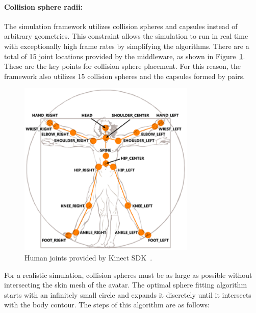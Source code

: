 \documentclass[number,preprint,review,12pt]{elsarticle}
\begin{document}
\paragraph{Collision sphere radii:}

The simulation framework utilizes collision spheres and capsules instead of arbitrary geometries. This constraint allows the simulation to run in real time with exceptionally high frame rates by simplifying the algorithms. There are a total of 15 joint locations provided by the middleware, as shown in Figure~\ref{fig:nite_joints}. These are the key points for collision sphere placement. For this reason, the framework also utilizes 15 collision spheres and the capsules formed by pairs.

\begin{figure}[htbp]
	\begin{center}
	\includegraphics[width=0.75\textwidth]{nite_joints.eps}
	\end{center}
	\caption{Human joints provided by Kinect SDK~\cite{CodeProject2011}.}
	\label{fig:nite_joints}
\end{figure}

For a realistic simulation, collision spheres must be as large as possible without intersecting the skin mesh of the avatar. The optimal sphere fitting algorithm starts with an infinitely small circle and expands it discretely until it intersects with the body contour. The steps of this algorithm are as follows:  
\end{document}
